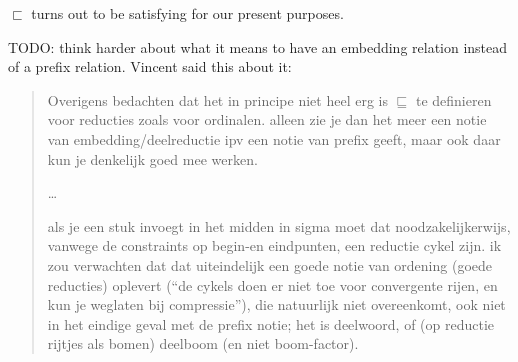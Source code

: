 $\sqsubset$ turns out to be satisfying for our present purposes.

TODO: think harder about what it means to have an embedding relation instead
of a prefix relation. Vincent said this about it:
\begin{quote}
Overigens bedachten dat het in principe niet heel erg is $\sqsubseteq$ te
definieren voor reducties zoals voor ordinalen. alleen zie je dan het meer een
notie van embedding/deelreductie ipv een notie van prefix geeft, maar ook daar
kun je denkelijk goed mee werken.

\ldots

als je een stuk invoegt in het midden in sigma moet dat noodzakelijkerwijs,
vanwege de constraints op begin-en eindpunten, een reductie cykel zijn. ik zou
verwachten dat dat uiteindelijk een goede notie van ordening (goede reducties)
oplevert (``de cykels doen er niet toe voor convergente rijen, en kun je
weglaten bij compressie''), die natuurlijk niet overeenkomt, ook niet in het
eindige geval met de prefix notie; het is deelwoord, of (op reductie rijtjes
als bomen) deelboom (en niet boom-factor).
\end{quote}
